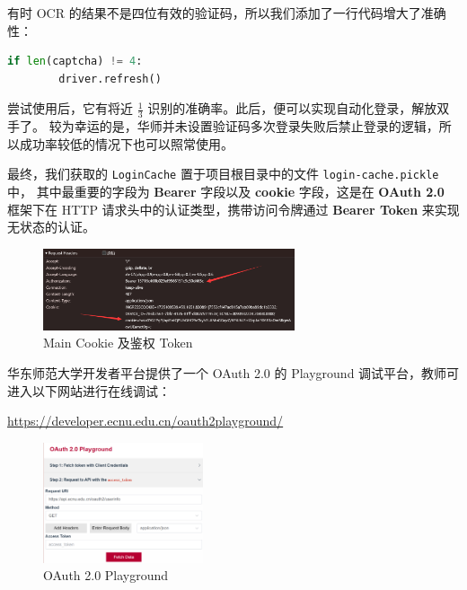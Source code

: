 \documentclass[14pt,a4paper,UTF8,twoside]{article}
\begin{document}
    有时 OCR 的结果不是四位有效的验证码，所以我们添加了一行代码增大了准确性：

    \begin{lstlisting}[language=Python]
    if len(captcha) != 4:
        driver.refresh()
    \end{lstlisting}

    尝试使用后，它有将近 $\frac{1}{3}$ 识别的准确率。此后，便可以实现自动化登录，解放双手了。
    较为幸运的是，华师并未设置验证码多次登录失败后禁止登录的逻辑，所以成功率较低的情况下也可以照常使用。

    最终，我们获取的 \texttt{LoginCache} 置于项目根目录中的文件 \texttt{login-cache.pickle} 中，
    其中最重要的字段为 \textbf{Bearer} 字段以及 \textbf{cookie} 字段，这是在 \textbf{OAuth 2.0} 框架下在 HTTP 请求头中的认证类型，携带访问令牌通过 \textbf{Bearer Token} 来实现无状态的认证。

    \begin{figure}[H]
        \centering
        \includegraphics[width=0.66\textwidth]{img/main_cache.png}
        \caption{Main Cookie 及鉴权 Token}
        \label{fig:main_cache}
    \end{figure}

    华东师范大学开发者平台提供了一个 OAuth 2.0 的 Playground 调试平台，教师可进入以下网站进行在线调试：

    \href{https://developer.ecnu.edu.cn/oauth2playground/}{\underline{https://developer.ecnu.edu.cn/oauth2playground/}}

    \begin{figure}[H]
        \centering
        \includegraphics[width=0.42\textwidth]{img/OAuth2Playground.png}
        \caption{OAuth 2.0 Playground}
        \label{fig:oauth2_playground}
    \end{figure}
\end{document}
